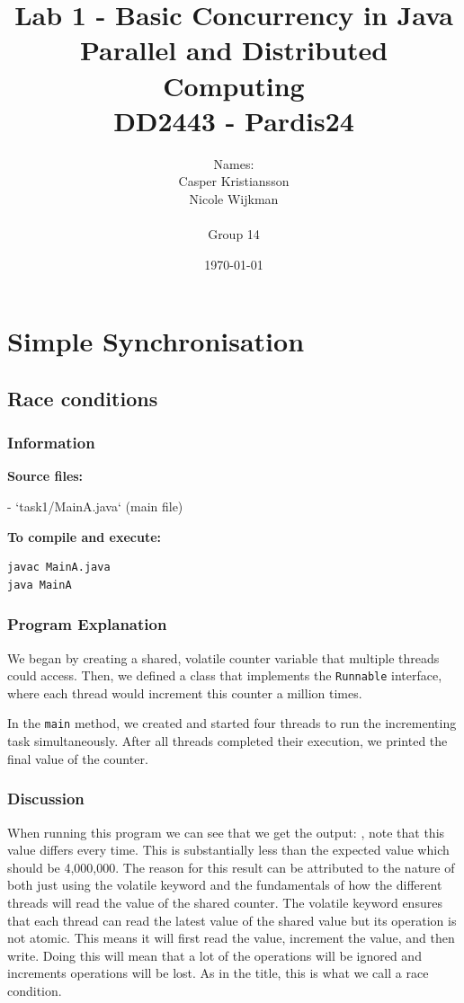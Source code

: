 \documentclass{article}
\title{\textbf{Lab 1 - Basic Concurrency in Java\\Parallel and Distributed Computing\\DD2443 - Pardis24}}
\author{Names:\\Casper Kristiansson\\Nicole Wijkman\\\\Group 14}
\date{\today}
\begin{document}
\setlength\parindent{0pt}
\setlength{\parskip}{\bigskipamount}

\maketitle

\section{Simple Synchronisation}


\subsection{Race conditions}

\subsubsection{Information}
\textbf{Source files:}

- `task1/MainA.java` (main file)

\textbf{To compile and execute:}
\begin{lstlisting}[style=bash]
javac MainA.java
java MainA
\end{lstlisting}

\subsubsection{Program Explanation}
We began by creating a shared, volatile counter variable that multiple threads could access. Then, we defined a class that implements the \texttt{Runnable} interface, where each thread would increment this counter a million times.

In the \texttt{main} method, we created and started four threads to run the incrementing task simultaneously. After all threads completed their execution, we printed the final value of the counter.

\subsubsection{Discussion}
When running this program we can see that we get the output: , note that this value differs every time. This is substantially less than the expected value which should be 4,000,000. The reason for this result can be attributed to the nature of both just using the volatile keyword and the fundamentals of how the different threads will read the value of the shared counter. The volatile keyword ensures that each thread can read the latest value of the shared value but its operation is not atomic. This means it will first read the value, increment the value, and then write. Doing this will mean that a lot of the operations will be ignored and increments operations will be lost. As in the title, this is what we call a race condition.
\end{document}
